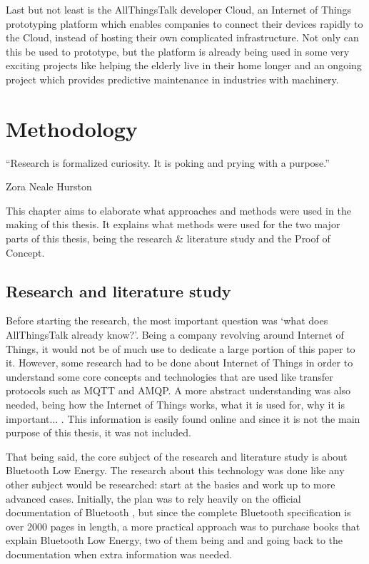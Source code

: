 \documentclass[pdftex,a4paper,12pt,twoside]{report}
\begin{document}
Last but not least is the AllThingsTalk developer Cloud, an Internet of Things prototyping platform which enables companies to connect their devices rapidly to the Cloud, instead of hosting their own complicated infrastructure. Not only can this be used to prototype, but the platform is already being used in some very exciting projects like helping the elderly live in their home longer and an ongoing project which provides predictive maintenance in industries with machinery.

\chapter{Methodology}
\label{ch:methodology}
\epigraph{``Research is formalized curiosity. It is poking and prying with a purpose.''}{Zora Neale Hurston}
This chapter aims to elaborate what approaches and methods were used in the making of this thesis. It explains what methods were used for the two major parts of this thesis, being the research \& literature study and the Proof of Concept.

\section{Research and literature study}
\label{sec:researchlit}
Before starting the research, the most important question was `what does AllThingsTalk already know?'. Being a company revolving around Internet of Things, it would not be of much use to dedicate a large portion of this paper to it. However, some research had to be done about Internet of Things in order to understand some core concepts and technologies that are used like transfer protocols such as MQTT and AMQP. A more abstract understanding was also needed, being how the Internet of Things works, what it is used for, why it is important... . This information is easily found online and since it is not the main purpose of this thesis, it was not included.

That being said, the core subject of the research and literature study is about Bluetooth Low Energy. The research about this technology was done like any other subject would be researched: start at the basics and work up to more advanced cases. Initially, the plan was to rely heavily on the official documentation of Bluetooth \citep{bluetooth2014bluetooth}, but since the complete Bluetooth specification is over 2000 pages in length, a more practical approach was to purchase books that explain Bluetooth Low Energy, two of them being \cite{Townsend2014} and \cite{heydon2012bluetooth} and going back to the documentation when extra information was needed.
\end{document}
